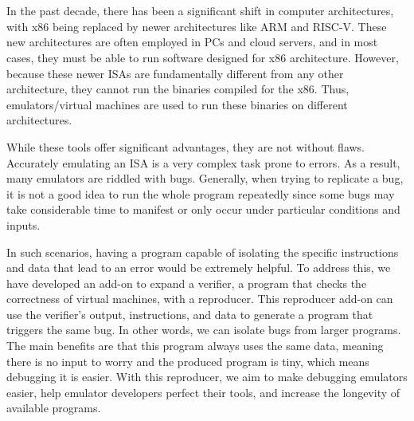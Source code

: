 

\chapter{\abstractname}
In the past decade, there has been a significant shift in computer architectures, with x86 being replaced by newer architectures like ARM and RISC-V.
These new architectures are often employed in PCs and cloud servers, and in most cases, they must be able to run software designed for x86 architecture.
However, because these newer ISAs are fundamentally different from any other architecture, they cannot run the binaries compiled for the x86.
Thus, emulators/virtual machines are used to run these binaries on different architectures.

While these tools offer significant advantages, they are not without flaws.
Accurately emulating an ISA is a very complex task prone to errors.
As a result, many emulators are riddled with bugs.
Generally, when trying to replicate a bug, it is not a good idea to run the whole program repeatedly since some bugs may take considerable time to manifest or only occur under particular conditions and inputs.

In such scenarios, having a program capable of isolating the specific instructions and data that lead to an error would be extremely helpful.
To address this, we have developed an add-on to expand a verifier, a program that checks the correctness of virtual machines, with a reproducer.
This reproducer add-on can use the verifier's output, instructions, and data to generate a program that triggers the same bug.
In other words, we can isolate bugs from larger programs.
The main benefits are that this program always uses the same data, meaning there is no input to worry and the produced program is tiny, which means debugging it is easier.
With this reproducer, we aim to make debugging emulators easier, help emulator developers perfect their tools, and increase the longevity of available programs.

